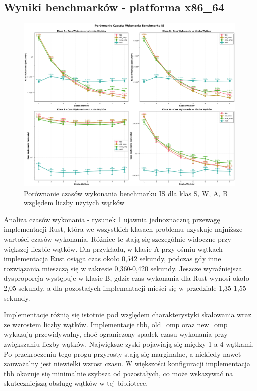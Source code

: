 \subsection{Wyniki benchmarków - platforma x86\_64}
\begin{figure}[H]
    \centering
    \includegraphics[width=\textwidth]{analiza/images/parallel/is/x86/is_porownanie_czasow_wykonania.png}
    \caption{Porównanie czasów wykonania benchmarku IS dla klas S, W, A, B względem liczby użytych wątków}
    \label{is_porownanie_czasow_wykonania_x86}
\end{figure}
Analiza czasów wykonania - rysunek \ref{is_porownanie_czasow_wykonania_x86} ujawnia jednoznaczną przewagę implementacji Rust, która we wszystkich klasach problemu uzyskuje najniższe wartości czasów wykonania. Różnice te stają się szczególnie widoczne przy większej liczbie wątków. Dla przykładu, w klasie A przy ośmiu wątkach implementacja Rust osiąga czas około 0,542 sekundy, podczas gdy inne rozwiązania mieszczą się w zakresie 0,360-0,420 sekundy. Jeszcze wyraźniejsza dysproporcja występuje w klasie B, gdzie czas wykonania dla Rust wynosi około 2,05 sekundy, a dla pozostałych implementacji mieści się w przedziale 1,35-1,55 sekundy.

Implementacje różnią się istotnie pod względem charakterystyki skalowania wraz ze wzrostem liczby wątków. Implementacje tbb, old\_omp oraz new\_omp wykazują przewidywalny, choć ograniczony spadek czasu wykonania przy zwiększaniu liczby wątków. Największe zyski pojawiają się między 1 a 4 wątkami. Po przekroczeniu tego progu przyrosty stają się marginalne, a niekiedy nawet zauważalny jest niewielki wzrost czasu. W większości konfiguracji implementacja tbb okazuje się minimalnie szybsza od pozostałych, co może wskazywać na skuteczniejszą obsługę wątków w tej bibliotece.

